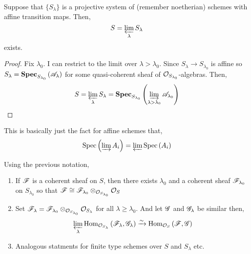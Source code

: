 \documentclass[12pt]{article}
\begin{document}
\begin{prop}
Suppose that $\{ S_\lambda \}$ is a projective system of (remember noetherian) schemes with affine transition maps. Then,
\[ S = \varprojlim_\lambda S_\lambda \]
exists. 
\end{prop}

\begin{proof}
Fix $\lambda_0$. I can restrict to the limit over $\lambda > \lambda_0$. Since $S_\lambda \to S_{\lambda_0}$ is affine so $S_\lambda = \mathbf{Spec}_{S_{\lambda_0}}\left( \mathscr{A}_\lambda \right)$ for some quasi-coherent sheaf of $\mathcal{O}_{S_{\lambda_0}}$-algebras. Then,
\[ S = \varprojlim_{\lambda} S_\lambda = \mathbf{Spec}_{S_{\lambda_0}}\left( \varinjlim_{\lambda > \lambda_0} \mathscr{A}_{\lambda_0} \right) \]
\end{proof}

\begin{rmk}
This is basically just the fact for affine schemes that,
\[ \mathrm{Spec}\left( \varinjlim A_i \right) = \varprojlim \mathrm{Spec}\left( A_i \right) \]
\end{rmk}

\begin{thm}
Using the previous notation,
\begin{enumerate}
\item If $\mathscr{F}$ is a coherent sheaf on $S$, then there exists $\lambda_0$ and a coherent sheaf $\mathscr{F}_{\lambda_0}$ on $S_{\lambda_0}$ so that $\mathscr{F} \cong \mathscr{F}_{\lambda_0} \otimes_{\mathcal{O}_{S_{\lambda_0}}} \mathcal{O}_{S}$ 
\item Set $\mathscr{F}_{\lambda} = \mathscr{F}_{\lambda_0} \otimes_{\mathcal{O}_{S_{\lambda_0}}} \mathcal{O}_{S_\lambda}$ for all $\lambda \ge \lambda_0$. And let $\mathscr{G}$ and $\mathscr{G}_{\lambda}$ be similar then,
\[ \varprojlim_{\lambda} \mathrm{Hom}_{\mathcal{O}_{S_{\lambda}}} \left( \mathscr{F}_\lambda, \mathscr{G}_\lambda \right) \xrightarrow{\sim} \mathrm{Hom}_{\mathcal{O}_{S}} \left( \mathscr{F}, \mathscr{G} \right) \]
\item Analogous statments for finite type schemes over $S$ and $S_\lambda$ etc.
\end{enumerate}
\end{thm}
\end{document}
